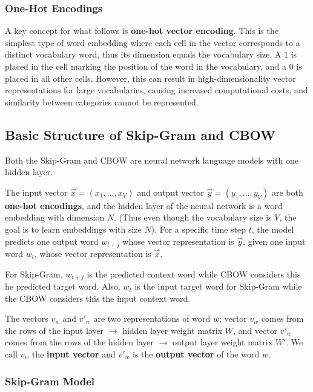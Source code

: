 \subsubsection{One-Hot Encodings} \label{sec:OneHotEncodings}

A key concept for what follows is \textbf{one-hot vector encoding}. This is the simplest type of word embedding where each cell in the vector corresponds to a distinct vocabulary word, thus its dimension equals the vocabulary size. A $1$ is placed in the cell marking the position of the word in the vocabulary, and a $0$ is placed in all other cells. However, this can result in high-dimensionality vector representations for large vocabularies, causing increased computational costs, and similarity between categories cannot be represented. 

\subsection{Basic Structure of Skip-Gram and CBOW} \label{sec:BasicSkipGramAndCBOW}

Both the Skip-Gram and CBOW are neural network language models with one hidden layer. 

The input vector $\overrightarrow{x} = (x_1,..., x_V)$ and output vector $\overrightarrow{y} = (y_1,...,y_V)$ are both \textbf{one-hot encodings}, and the hidden layer of the neural network is a word embedding with dimension $N$. (Thus even though the vocabulary size is $V$, the goal is to learn embeddings with size $N$). For a specific time step $t$, the model predicts one output word $w_{t+j}$ whose vector representation is $\overrightarrow{y}$, given one input word $w_t$, whose vector representation is $\overrightarrow{x}$. 

For Skip-Gram, $w_{t+j}$ is the predicted context word while CBOW considers this he predicted target word. Also, $w_t$ is the input target word for Skip-Gram while the CBOW considers this the input context word. 

The vectors $v_w$ and $v'_w$ are two representations of word $w$; vector $v_w$ comes from the rows of the input layer $\rightarrow$ hidden layer weight matrix $W$, and vector $v'_w$ comes from the rows of the hidden layer $\rightarrow$ output layer weight matrix $W'$. We call $v_w$ the \textbf{input vector} and $v'_w$ is the \textbf{output vector} of the word $w$. 


\subsubsection{Skip-Gram Model} \label{sec:SkipGram}

